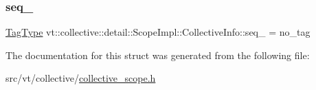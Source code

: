 \mbox{\label{structvt_1_1collective_1_1detail_1_1_scope_impl_1_1_collective_info_ae8212822c750374cb79a37fe0ef21d7e}} 
\subsubsection{\texorpdfstring{seq\+\_\+}{seq\_}}
{\footnotesize\ttfamily \hyperlink{namespacevt_a84ab281dae04a52a4b243d6bf62d0e52}{Tag\+Type} vt\+::collective\+::detail\+::\+Scope\+Impl\+::\+Collective\+Info\+::seq\+\_\+ = no\+\_\+tag}



The documentation for this struct was generated from the following file\+:\begin{DoxyCompactItemize}
\item 
src/vt/collective/\hyperlink{collective__scope_8h}{collective\+\_\+scope.\+h}\end{DoxyCompactItemize}
